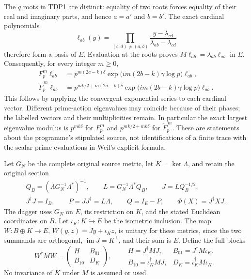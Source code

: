 \documentclass[11pt]{article}
\begin{document}
The $q$ roots in TDP1 are distinct: equality of two roots forces equality
of their real and imaginary parts, and hence $a=a'$ and $b=b'$.
The exact cardinal polynomials
\begin{equation}\tag{TDP2}
\ell_{ab}(y)=\prod_{(c,d)\ne(a,b)}
 \frac{y-\lambda_{cd}}{\lambda_{ab}-\lambda_{cd}}
\end{equation}
therefore form a basis of $E$. Evaluation at the roots proves
$M\ell_{ab}=\lambda_{ab}\ell_{ab}$ in $E$. Consequently, for every
integer $m\ge0$,
\begin{equation}\tag{TDP3}
\begin{aligned}
F_p^m\ell_{ab}
 &=p^{m(2a-k)\delta}
   \exp\!\bigl(im(2b-k)\gamma\log p\bigr)\ell_{ab},\\
\widetilde F_p^{\,m}\ell_{ab}
 &=p^{mk/2+m(2a-k)\delta}
   \exp\!\bigl(im(2b-k)\gamma\log p\bigr)\ell_{ab}.
\end{aligned}
\end{equation}
This follows by applying the convergent exponential series to each
cardinal vector. Different prime-action eigenvalues may coincide because
of their phases; the labelled vectors and their multiplicities remain.
In particular the exact largest eigenvalue modulus is $p^{mk\delta}$
for $F_p^m$ and $p^{mk/2+mk\delta}$ for $\widetilde F_p^{\,m}$.
These are statements about the programme's stipulated source, not
identifications of a finite trace with the scalar prime evaluations in
Weil's explicit formula.

Let $G_N$ be the complete original source metric, let
$K=\ker\Lambda$, and retain the original section
\begin{equation}\tag{TDP4}
\begin{gathered}
Q_B=(\Lambda G_N^{-1}\Lambda^*)^{-1},\qquad
L=G_N^{-1}\Lambda^*Q_B,\qquad J=LQ_B^{-1/2},\\
J^\dagger J=I_B,\qquad P=JJ^\dagger=L\Lambda,\qquad
Q=I_E-P,\qquad \Phi(X)=J^\dagger XJ.
\end{gathered}
\end{equation}
The dagger uses $G_N$ on $E$, its restriction on $K$, and the stated
Euclidean coordinates on $B$. Let $\iota_K:K\hookrightarrow E$ be the
isometric inclusion. The map $W:B\oplus K\to E$,
$W(y,z)=Jy+\iota_Kz$, is unitary for these metrics, since the two
summands are orthogonal, $\operatorname{im}J=K^\perp$, and their sum is
$E$. Define the full blocks
\begin{equation}\tag{TDP5}
W^\dagger MW=
\begin{pmatrix}H&B_{01}\\ B_{10}&D_K\end{pmatrix},\qquad
\begin{array}{ll}
H=J^\dagger MJ,&B_{01}=J^\dagger M\iota_K,\\
B_{10}=\iota_K^\dagger MJ,&D_K=\iota_K^\dagger M\iota_K.
\end{array}
\end{equation}
No invariance of $K$ under $M$ is assumed or used.
\end{document}

